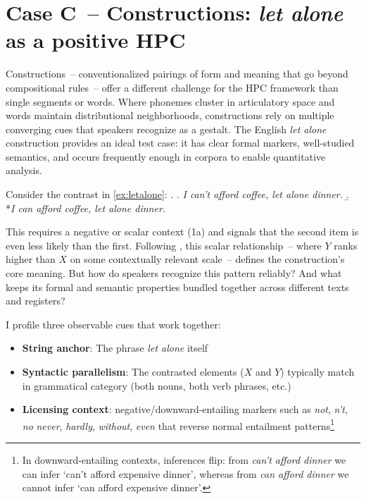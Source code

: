 \documentclass[12pt]{article}
\begin{document}
\section{Case C~-- Constructions: \textit{let alone} as a positive HPC}\label{sec:case-construction}

Constructions~-- conventionalized pairings of form and meaning that go beyond compositional rules~-- offer a different challenge for the HPC framework than single segments or words. Where phonemes cluster in articulatory space and words maintain distributional neighborhoods, constructions rely on multiple converging cues that speakers recognize as a gestalt. The English \textit{let alone} construction provides an ideal test case: it has clear formal markers, well-studied semantics, and occurs frequently enough in corpora to enable quantitative analysis.

Consider the contrast in \ref{ex:letalone}:
\ex.\label{ex:letalone}
    \a. \textit{I can't afford coffee, let alone dinner.}
    \b. *\textit{I can afford coffee, let alone dinner.}
    
This requires a negative or scalar context (1a) and signals that the second item is even less likely than the first. Following \citet{FillmoreKayOConnor1988}, this scalar relationship~-- where $Y$ ranks higher than $X$ on some contextually relevant scale~-- defines the construction's core meaning. But how do speakers recognize this pattern reliably? And what keeps its formal and semantic properties bundled together across different texts and registers?

I profile three observable cues that work together:
\begin{itemize}
\item \textbf{String anchor}: The phrase \textit{let alone} itself
\item \textbf{Syntactic parallelism}: The contrasted elements ($X$ and $Y$) typically match in grammatical category (both nouns, both verb phrases, etc.)
\item \textbf{Licensing context}: negative/downward-entailing markers such as \textit{not}, \textit{n’t}, \textit{no} \textit{never}, \textit{hardly}, \textit{without}, \textit{even} that reverse normal entailment patterns\footnote{In downward-entailing contexts, inferences flip: from \textit{can't afford dinner} we can infer `can't afford expensive dinner', whereas from \textit{can afford dinner} we cannot infer `can afford expensive dinner'.}
\end{itemize}
\end{document}

